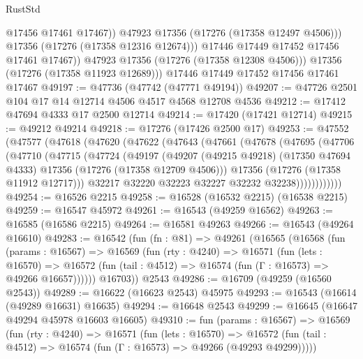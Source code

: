 \begin{lexlean}{RustStd}
\begin{coremodule}
                    @17456
                    @17461
                    @17467))
                @47923
                @17356
                (@17276 (@17358 @12497 @4506)))
              @17356
              (@17276 (@17358 @12316 @12674)))
            @17446
            @17449
            @17452
            @17456
            @17461
            @17467))
        @47923
        @17356
        (@17276 (@17358 @12308 @4506)))
      @17356
      (@17276 (@17358 @11923 @12689)))
    @17446
    @17449
    @17452
    @17456
    @17461
    @17467
@49197 := @47736 (@47742 (@47771 @49194))
@49207 := @47726 @2501 @104 @17 @14 @12714 @4506 @4517 @4568 @12708 @4536
@49212 := @17412 @47694 @4333 @17 @2500 @12714
@49214 := @17420 (@17421 @12714)
@49215 := @49212 @49214
@49218 := @17276 (@17426 @2500 @17)
@49253 := @47552
    (@47577
      (@47618
        (@47620
          (@47622
            (@47643
              (@47661
                (@47678
                  (@47695
                    (@47706
                      (@47710
                        (@47715
                          (@47724
                            (@49197
                              (@49207
                                (@49215 @49218)
                                (@17350 @47694 @4333)
                                @17356
                                (@17276 (@17358 @12709 @4506)))
                              @17356
                              (@17276 (@17358 @11912 @12717)))
                            @32217
                            @32220
                            @32223
                            @32227
                            @32232
                            @32238))))))))))))
@49254 := @16526 @2215
@49258 := @16528 (@16532 @2215) (@16538 @2215)
@49259 := @16547 @45972
@49261 := @16543 (@49259 @16562)
@49263 := @16585 (@16586 @2215)
@49264 := @16581 @49263
@49266 := @16543 (@49264 @16610)
@49283 := @16542
    (fun (fn : @81) =>
    @49261
      (@16565
        (@16568
          (fun (params : @16567) =>
          @16569
            (fun (rty : @4240) =>
            @16571
              (fun (lets : @16570) =>
              @16572 (fun (tail : @4512) => @16574 (fun (Γ : @16573) => @49266 @16657))))))
        @16703))
    @2543
@49286 := @16709 (@49259 (@16560 @2543))
@49289 := @16622 (@16623 @2543) @45975
@49293 := @16543 (@16614 (@49289 @16631) @16635)
@49294 := @16648 @2543
@49299 := @16645 (@16647 @49294 @45978 @16603 @16605)
@49310 := fun (params : @16567) =>
  @16569
    (fun (rty : @4240) =>
    @16571
      (fun (lets : @16570) =>
      @16572 (fun (tail : @4512) => @16574 (fun (Γ : @16573) => @49266 (@49293 @49299)))))

\end{coremodule}
\end{lexlean}
